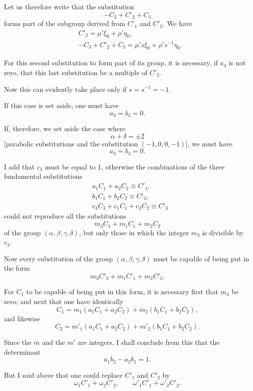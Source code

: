 \documentclass{article}
\begin{document}
Let us therefore write that the substitution
\[ -C_{3} + C'_{2} + C_{3} \]
forms part of the subgroup derived from $C'_{1}$ and $C'_{2}$. We have
\[ \begin{aligned} &C'_{2} = \mu'\xi_{0} + \rho'\eta_{0},\\ &-C_{3} + C'_{2} + C_{3} = \mu's\xi_{0} + \rho's^{-1}\eta_{0}. \end{aligned} \]

For this second substitution to form part of its group, it is necessary, if $a_{3}$ is not zero, that this last substitution be a multiple of $C'_{2}$.

Now this can evidently take place only if $s = s^{-1} = -1$.

If this case is set aside, one must have
\[ a_{3} = b_{3} = 0. \]

If, therefore, we set aside the case where
\[ \alpha + \delta = \pm 2 \]
[parabolic substitutions and the substitution $(-1, 0, 0, -1)$], we must have
\[ a_{3} = b_{3} = 0. \]

I add that $c_{3}$ must be equal to 1, otherwise the combinations of the three fundamental substitutions
\[ \begin{aligned} &a_{1}C_{1} + a_{2}C_{2} \equiv C'_{1},\\ &b_{1}C_{1} + b_{2}C_{2} \equiv C'_{2},\\ &c_{3}C_{3} + c_{1}C_{1} + c_{2}C_{2} \equiv C'_{3} \end{aligned} \]
could not reproduce all the substitutions
\[ m_{3}C_{3} + m_{1}C_{1} + m_{2}C_{2} \]
of the group $(\alpha, \beta, \gamma, \delta)$, but only those in which the integer $m_{3}$ is divisible by $c_{3}$.

Now every substitution of the group $(\alpha, \beta, \gamma, \delta)$ must be capable of being put in the form
\[ m_{3}C'_{3} + m_{1}C'_{1} + m_{2}C'_{2}. \]

For $C_{1}$ to be capable of being put in this form, it is necessary first that $m_{3}$ be zero; and next that one have identically
\[ C_{1} = m_{1}(a_{1}C_{1} + a_{2}C_{2}) + m_{2}(b_{1}C_{1} + b_{2}C_{2}), \]
and likewise
\[ C_{2} = m'_{1}(a_{1}C_{1} + a_{2}C_{2}) + m'_{2}(b_{1}C_{1} + b_{2}C_{2}). \]

Since the $m$ and the $m'$ are integers, I shall conclude from this that the determinant
\[ a_{1}b_{2} - a_{2}b_{1} = 1. \]

But I said above that one could replace $C'_{1}$ and $C'_{2}$ by
\[ \omega_{1}C'_{1} + \omega_{2}C'_{2}, \qquad \omega'_{1}C'_{1} + \omega'_{2}C'_{2}. \]
\end{document}
